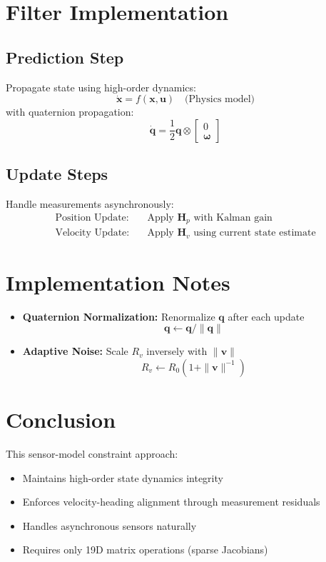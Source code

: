 \documentclass{article}
\begin{document}
	\section{Filter Implementation}
	\subsection{Prediction Step}
	Propagate state using high-order dynamics:
	\[
	\dot{\mathbf{x}} = f(\mathbf{x},\mathbf{u}) \quad \text{(Physics model)}
	\]
	with quaternion propagation:
	\[
	\dot{\mathbf{q}} = \frac{1}{2}\mathbf{q} \otimes \begin{bmatrix}0 \\ \boldsymbol{\omega}\end{bmatrix}
	\]

	\subsection{Update Steps}
	Handle measurements asynchronously:
	\begin{align*}
		\text{Position Update:} & \quad \text{Apply } \mathbf{H}_p \text{ with Kalman gain} \\
		\text{Velocity Update:} & \quad \text{Apply } \mathbf{H}_v \text{ using current state estimate}
	\end{align*}

	\section{Implementation Notes}
	\begin{itemize}
		\item \textbf{Quaternion Normalization:} Renormalize $\mathbf{q}$ after each update
		\[
		\mathbf{q} \leftarrow \mathbf{q}/\|\mathbf{q}\|
		\]
		\item \textbf{Adaptive Noise:} Scale $R_v$ inversely with $\|\mathbf{v}\|$
		\[
		R_v \leftarrow R_0(1 + \|\mathbf{v}\|^{-1})
		\]
	\end{itemize}

	\section{Conclusion}
	This sensor-model constraint approach:
	\begin{itemize}
		\item Maintains high-order state dynamics integrity
		\item Enforces velocity-heading alignment through measurement residuals
		\item Handles asynchronous sensors naturally
		\item Requires only 19D matrix operations (sparse Jacobians)
	\end{itemize}
\end{document}
